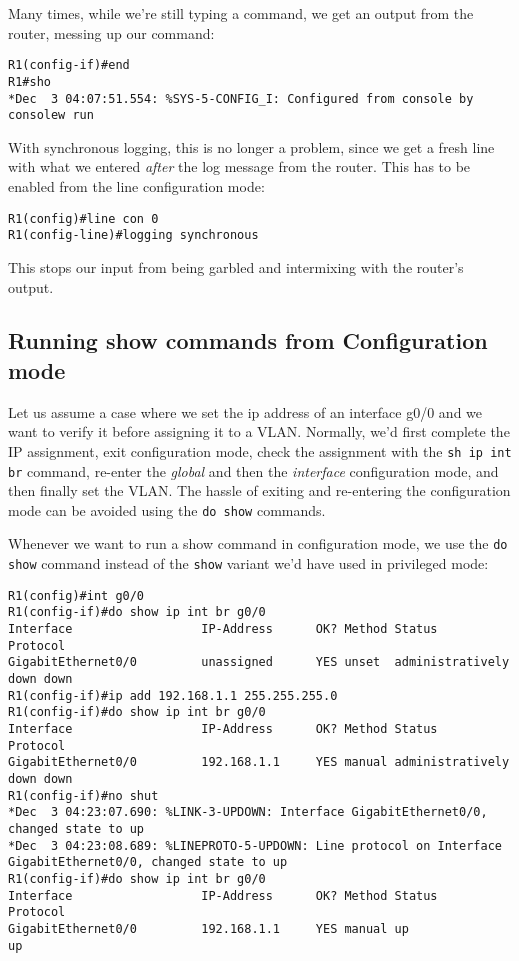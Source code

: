 \noindent
Many times, while we're still typing a command, we get an output from the router, messing up our command:

\vspace{-15pt}
\begin{verbatim}
R1(config-if)#end
R1#sho
*Dec  3 04:07:51.554: %SYS-5-CONFIG_I: Configured from console by consolew run
\end{verbatim}
\vspace{-10pt}

\noindent
With synchronous logging, this is no longer a problem, since we get a fresh line with what we entered \textit{after} the log message from the router. This has to be enabled from the line configuration mode: 

\vspace{-15pt}
\begin{verbatim}
R1(config)#line con 0
R1(config-line)#logging synchronous
\end{verbatim}
\vspace{-10pt}

\noindent
This stops our input from being garbled and intermixing with the router's output. 

\subsection{Running show commands from Configuration mode}
Let us assume a case where we set the ip address of an interface g0/0 and we want to verify it before assigning it to a VLAN. Normally, we'd first complete the IP assignment, exit configuration mode, check the assignment with the \verb|sh ip int br| command, re-enter the \textit{global} and then the \textit{interface} configuration mode, and then finally set the VLAN. The hassle of exiting and re-entering the configuration mode can be avoided using the \verb|do show| commands.

Whenever we want to run a show command in configuration mode, we use the \verb|do show| command instead of the \verb|show| variant we'd have used in privileged mode:

\vspace{-15pt}
\begin{verbatim}
R1(config)#int g0/0
R1(config-if)#do show ip int br g0/0
Interface                  IP-Address      OK? Method Status                Protocol
GigabitEthernet0/0         unassigned      YES unset  administratively down down
R1(config-if)#ip add 192.168.1.1 255.255.255.0
R1(config-if)#do show ip int br g0/0
Interface                  IP-Address      OK? Method Status                Protocol
GigabitEthernet0/0         192.168.1.1     YES manual administratively down down
R1(config-if)#no shut
*Dec  3 04:23:07.690: %LINK-3-UPDOWN: Interface GigabitEthernet0/0, changed state to up
*Dec  3 04:23:08.689: %LINEPROTO-5-UPDOWN: Line protocol on Interface GigabitEthernet0/0, changed state to up
R1(config-if)#do show ip int br g0/0
Interface                  IP-Address      OK? Method Status                Protocol
GigabitEthernet0/0         192.168.1.1     YES manual up                    up
\end{verbatim}
\vspace{-10pt}


